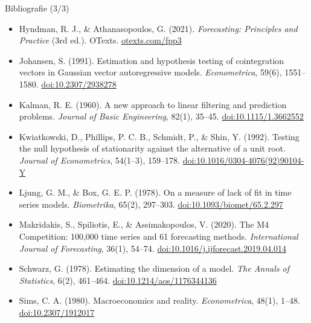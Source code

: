 \begin{frame}{Bibliografie (3/3)}
\itemsize{\scriptsize}
\begin{itemize}
    \item Hyndman, R. J., \& Athanasopoulos, G. (2021). \textit{Forecasting: Principles and Practice} (3rd ed.). OTexts. \href{https://otexts.com/fpp3/}{otexts.com/fpp3}
    \item Johansen, S. (1991). Estimation and hypothesis testing of cointegration vectors in Gaussian vector autoregressive models. \textit{Econometrica}, 59(6), 1551--1580. \href{https://doi.org/10.2307/2938278}{doi:10.2307/2938278}
    \item Kalman, R. E. (1960). A new approach to linear filtering and prediction problems. \textit{Journal of Basic Engineering}, 82(1), 35--45. \href{https://doi.org/10.1115/1.3662552}{doi:10.1115/1.3662552}
    \item Kwiatkowski, D., Phillips, P. C. B., Schmidt, P., \& Shin, Y. (1992). Testing the null hypothesis of stationarity against the alternative of a unit root. \textit{Journal of Econometrics}, 54(1--3), 159--178. \href{https://doi.org/10.1016/0304-4076(92)90104-Y}{doi:10.1016/0304-4076(92)90104-Y}
    \item Ljung, G. M., \& Box, G. E. P. (1978). On a measure of lack of fit in time series models. \textit{Biometrika}, 65(2), 297--303. \href{https://doi.org/10.1093/biomet/65.2.297}{doi:10.1093/biomet/65.2.297}
    \item Makridakis, S., Spiliotis, E., \& Assimakopoulos, V. (2020). The M4 Competition: 100,000 time series and 61 forecasting methods. \textit{International Journal of Forecasting}, 36(1), 54--74. \href{https://doi.org/10.1016/j.ijforecast.2019.04.014}{doi:10.1016/j.ijforecast.2019.04.014}
    \item Schwarz, G. (1978). Estimating the dimension of a model. \textit{The Annals of Statistics}, 6(2), 461--464. \href{https://doi.org/10.1214/aos/1176344136}{doi:10.1214/aos/1176344136}
    \item Sims, C. A. (1980). Macroeconomics and reality. \textit{Econometrica}, 48(1), 1--48. \href{https://doi.org/10.2307/1912017}{doi:10.2307/1912017}
\end{itemize}
\end{frame}



